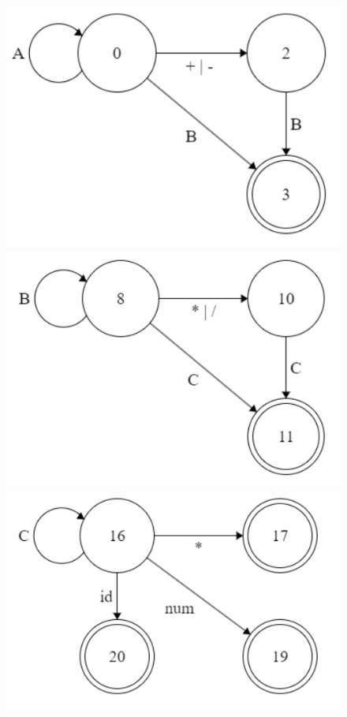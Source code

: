 \documentclass[]{article}
\begin{document}
\begin{figure}[H]
    \centering
    \includegraphics[scale=0.5]{figure/5-1-A-2.png}
    \includegraphics[scale=0.5]{figure/5-1-B-2.png}
    \includegraphics[scale=0.5]{figure/5-1-C-2.png}
\end{figure}
\end{document}
